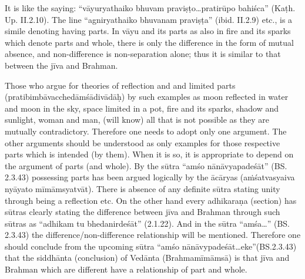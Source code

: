 It is like the saying: “vāyuryathaiko bhuvam praviṣṭo…pratirūpo bahiśca” (Kaṭh. Up. II.2.10). The line “agniryathaiko bhuvanam praviṣṭa” (ibid. II.2.9) etc., is a simile denoting having parts.  In vāyu and its parts as also in fire and its sparks which denote parts and whole, there is only the difference in the form of mutual absence, and non-difference is non-separation alone; thus it is similar to that between the jīva and Brahman.

Those who argue for theories of reflection and and limited parts (pratibimbāvacchedāmśādivādāḥ) by such examples as moon reflected in water and moon in the sky, space limited in a pot, fire and its sparks, shadow and sunlight, woman and man, (will know) all that is not possible as they are mutually contradictory. Therefore one needs to adopt only one argument. The other arguments should be understood as only examples for those respective parts which is intended (by them). When it is so, it is appropriate to depend on the argument of parts (and whole).  By the sūtra “amśo nānāvyapadeśāt” (BS. 2.3.43) possessing parts has been argued logically by the ācāryas (aṁśatvasyaiva nyāyato mīmāmsyatvāt). There is absence of any definite sūtra stating unity through being a reflection etc. On the other hand every adhikaraṇa (section) has sūtras clearly stating the difference between jīva and Brahman through such sūtras as “adhikam tu bhedanirdeśāt” (2.1.22). And in the sūtra “amśa…” (BS. 2.3.43) the difference/non-difference relationship will be  mentioned. Therefore one should conclude from the upcoming sūtra “amśo nānāvypadeśāt…eke”(BS.2.3.43) that the siddhānta (conclusion) of Vedānta (Brahmamīmāmsā) is that jīva and Brahman which are different have a relationship of part and whole.


